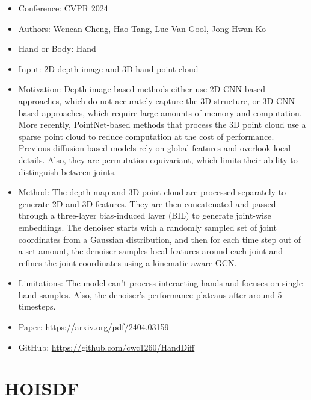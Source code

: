 \documentclass{article}
\begin{document}
\begin{itemize}
    \item Conference: CVPR 2024
    \item Authors: Wencan Cheng, Hao Tang, Luc Van Gool, Jong Hwan Ko
    \item Hand or Body: Hand
    \item Input: 2D depth image and 3D hand point cloud
    \item Motivation: Depth image-based methods either use 2D CNN-based approaches, which do not accurately capture the 3D structure, or 3D CNN-based approaches, which require large amounts of memory and computation. More recently, PointNet-based methods that process the 3D point cloud use a sparse point cloud to reduce computation at the cost of performance. Previous diffusion-based models rely on global features and overlook local details. Also, they are permutation-equivariant, which limits their ability to distinguish between joints.
    \item Method: The depth map and 3D point cloud are processed separately to generate 2D and 3D features. They are then concatenated and passed through a three-layer bias-induced layer (BIL) to generate joint-wise embeddings. The denoiser starts with a randomly sampled set of joint coordinates from a Gaussian distribution, and then for each time step out of a set amount, the denoiser samples local features around each joint and refines the joint coordinates using a kinematic-aware GCN.
    \item Limitations: The model can't process interacting hands and focuses on single-hand samples. Also, the denoiser's performance plateaus after around 5 timesteps.
    \item Paper: \url{https://arxiv.org/pdf/2404.03159}
    \item GitHub: \url{https://github.com/cwc1260/HandDiff}
\end{itemize}

\section*{HOISDF}
\end{document}
